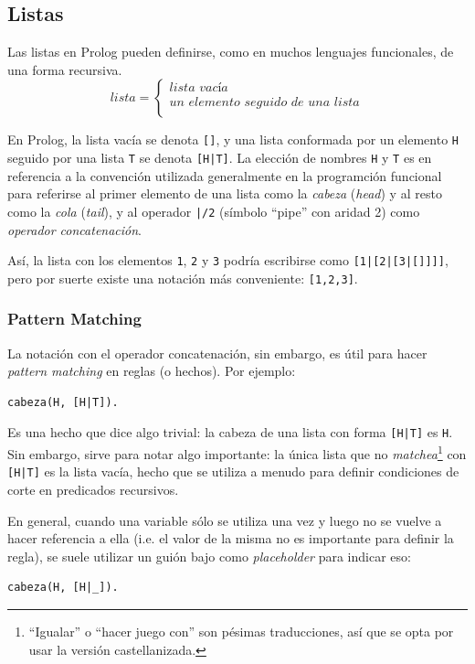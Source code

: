 \documentclass[12pt,titlepage]{article}
\begin{document}
\subsection{Listas}

Las listas en Prolog pueden definirse, como en muchos lenguajes funcionales, de una forma recursiva. 
\[
\textit{lista} = \left\{
  \begin{array}{l}
  \textit{lista vacía} \\
  \textit{un elemento seguido de una lista} \\
  \end{array} \right.
\]

En Prolog, la lista vacía se denota \lstinline|[]|, y una lista conformada por un elemento \lstinline|H| seguido por una lista \lstinline|T| se denota \lstinline$[H|T]$. La elección de nombres \lstinline|H| y \lstinline|T| es en referencia a la convención utilizada generalmente en la programción funcional para referirse al primer elemento de una lista como la \emph{cabeza} (\emph{head}) y al resto como la \emph{cola} (\emph{tail}), y al operador \lstinline$|/2$ (símbolo ``pipe'' con aridad 2) como \emph{operador concatenación}. 

Así, la lista con los elementos \lstinline|1|, \lstinline|2| y \lstinline|3| podría escribirse como \lstinline$[1|[2|[3|[]]]]$, pero por suerte existe una notación más conveniente: \lstinline|[1,2,3]|.

\subsubsection*{Pattern Matching}

La notación con el operador concatenación, sin embargo, es útil para hacer \emph{pattern matching} en reglas (o hechos). Por ejemplo:
\begin{lstlisting}
cabeza(H, [H|T]).
\end{lstlisting}

Es una hecho que dice algo trivial: la cabeza de una lista con forma \lstinline$[H|T]$ es \lstinline|H|. Sin embargo, sirve para notar algo importante: la única lista que no \emph{matchea}\footnote{``Igualar'' o ``hacer juego con'' son pésimas traducciones, así que se opta por usar la versión castellanizada.} con \lstinline$[H|T]$ es la lista vacía, hecho que se utiliza a menudo para definir condiciones de corte en predicados recursivos.

En general, cuando una variable sólo se utiliza una vez y luego no se vuelve a hacer referencia a ella (i.e. el valor de la misma no es importante para definir la regla), se suele utilizar un guión bajo como \emph{placeholder} para indicar eso:
\begin{lstlisting}
cabeza(H, [H|_]).
\end{lstlisting}
\end{document}

